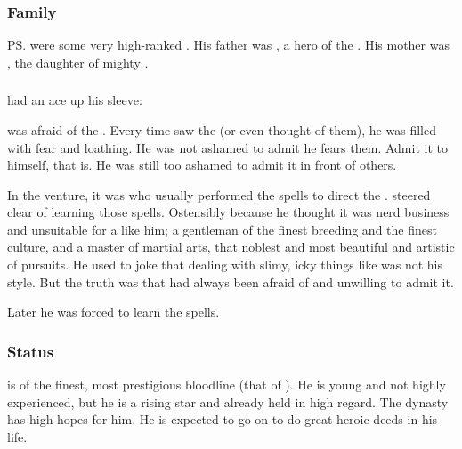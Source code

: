 \subsubsection{Family}
\ps{\Teshrial} were some very high-ranked \resphain. 
His father was , a hero of the . 
His mother was \Zereth, the daughter of mighty . 





\subsubsection{\Ghobaleth}
\Teshrial{} had an ace up his sleeve: 

\Teshrial was afraid of the \noggyaleth. 
Every time \Teshrial saw the \noggyaleth (or even thought of them), he was filled with fear and loathing. 
He was not ashamed to admit he fears them. 
Admit it to himself, that is.
He was still too ashamed to admit it in front of others.

In the \Malcur venture, it was \Urizeth who usually performed the spells to direct the \noggyaleth.
\Teshrial steered clear of learning those spells. 
Ostensibly because he thought it was nerd business and unsuitable for a \resphan like him; a gentleman of the finest breeding and the finest culture, and a master of martial arts, that noblest and most beautiful and artistic of pursuits. 
He used to joke that dealing with slimy, icky things like \noggyaleth was not his style. 
But the truth was that \Teshrial had always been afraid of \noggyaleth and unwilling to admit it. 

Later he was forced to learn the \noggyal spells. 




\subsubsection{Status}
\Teshrial{} is of the finest, most prestigious bloodline (that of \Azraid).
He is young and not highly experienced, but he is a rising star and already held in high regard. 
The dynasty has high hopes for him. 
He is expected to go on to do great heroic deeds in his life. 







